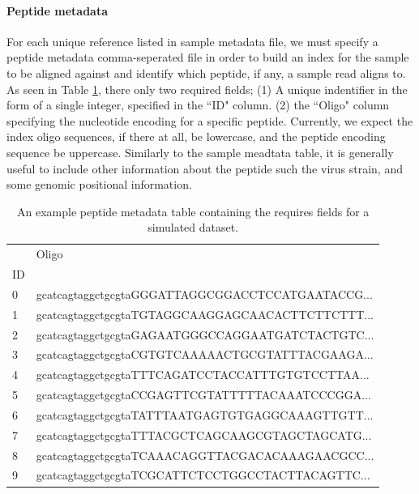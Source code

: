 \documentclass{article}
\begin{document}
\paragraph{Peptide metadata}
For each unique reference listed in sample metadata file, we must specify a peptide metadata comma-seperated file
in order to build an index for the sample to be aligned against and identify which peptide, if any, a sample read aligns to.
As seen in Table \ref{tab:peptide_metadata}, there only two required fields;
(1) A unique indentifier in the form of a single integer, specified in the ``ID" column.
(2) the ``Oligo" column specifying the nucleotide encoding for a specific peptide. 
Currently, we expect the index oligo sequences, if there at all, be lowercase, and the peptide encoding sequence be uppercase.
Similarly to the sample meadtata table, it is generally useful to include other information about the peptide such the virus
strain, and some genomic positional information.

\begin{table}
\centering
\begin{tabular}{ll}
\toprule
{} &                                              Oligo \\
ID &                                                    \\
\midrule
0  &  gcatcagtaggctgcgtaGGGATTAGGCGGACCTCCATGAATACCG... \\
1  &  gcatcagtaggctgcgtaTGTAGGCAAGGAGCAACACTTCTTCTTT... \\
2  &  gcatcagtaggctgcgtaGAGAATGGGCCAGGAATGATCTACTGTC... \\
3  &  gcatcagtaggctgcgtaCGTGTCAAAAACTGCGTATTTACGAAGA... \\
4  &  gcatcagtaggctgcgtaTTTCAGATCCTACCATTTGTGTCCTTAA... \\
5  &  gcatcagtaggctgcgtaCCGAGTTCGTATTTTTACAAATCCCGGA... \\
6  &  gcatcagtaggctgcgtaTATTTAATGAGTGTGAGGCAAAGTTGTT... \\
7  &  gcatcagtaggctgcgtaTTTACGCTCAGCAAGCGTAGCTAGCATG... \\
8  &  gcatcagtaggctgcgtaTCAAACAGGTTACGACACAAAGAACGCC... \\
9  &  gcatcagtaggctgcgtaTCGCATTCTCCTGGCCTACTTACAGTTC... \\
\bottomrule
\end{tabular}
\caption{An example peptide metadata table containing the requires fields for a simulated dataset.}
\label{tab:peptide_metadata}
\end{table}
\end{document}
